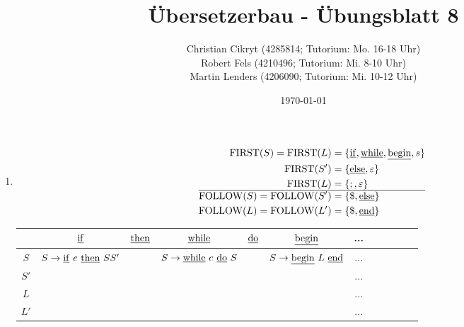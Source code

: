 \documentclass[a4paper,10pt]{scrartcl}
\title{Übersetzerbau - Übungsblatt 8}
\author{Christian Cikryt (4285814; Tutorium: Mo. 16-18 Uhr)\\
  Robert Fels (4210496; Tutorium: Mi. 8-10 Uhr)\\
  Martin Lenders (4206090; Tutorium: Mi. 10-12 Uhr)
  }
\date{\today}
\newcommand{\FIRST}{\operatorname{FIRST}}
\newcommand{\FOLLOW}{\operatorname{FOLLOW}}
\begin{document}
\maketitle

\section{}
\begin{enumerate}
\newcommand{\IF}{\underline{\rm if}}
\newcommand{\THEN}{\underline{\rm then}}
\newcommand{\ELSE}{\underline{\rm else}}
\newcommand{\WHILE}{\underline{\rm while}}
\newcommand{\DO}{\underline{\rm do}}
\newcommand{\BEGIN}{\underline{\rm begin}}
\newcommand{\END}{\underline{\rm end}}
\item   \begin{align*}
            \FIRST(S) = \FIRST(L)  &= \{\IF, \WHILE, \BEGIN, s\} \\
                        \FIRST(S') &= \{\ELSE, \varepsilon\} \\
                        \FIRST(L)  &= \{;, \varepsilon\} \\\hline
            \FOLLOW(S) = \FOLLOW(S') &= \{\$, \ELSE\} \\
            \FOLLOW(L) = \FOLLOW(L') &= \{\$, \END\}
        \end{align*}
        \begin{center}
            \begin{tabular}{c||c|c|c|c|c|c|c|c|c|c|c|}
                & $\IF$                       & $\THEN$ & $\WHILE$                  & $\DO$ & $\BEGIN$                & ... 
                \\\hline\hline
            $S$ & $S \to \IF\ e\ \THEN\ S S'$ &         & $S \to \WHILE\ e\ \DO\ S$ &       & $S \to \BEGIN\ L\ \END$ & ...
                \\\hline
            $S'$&                             &         &                           &       &                         & ...
                \\\hline 
            $L$ &                             &         &                           &       &                         & ...
                \\\hline
            $L'$&                             &         &                           &       &                         & ...
                \\\hline
            \end{tabular}
        \end{center}
        \begin{center}

\end{center}
\end{enumerate}
\end{document}
